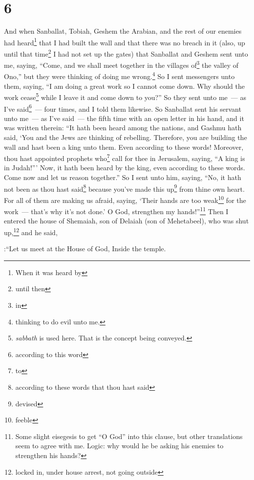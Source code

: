 \section{6}\label{Nehemiah 6}
\begin{enumerate}[align=center]
     And when Sanballat, Tobiah, Geshem the Arabian, and the rest of our enemies had heard\footnote{When it was heard by} that I had built the wall and that there was no breach in it (also, up until that time\footnote{until then} I had not set up the gates)%
     that Sanballat and Geshem sent unto me, saying, ``Come, and we shall meet together in the villages of\footnote{in} the valley of Ono,'' but they were thinking of doing me wrong.\footnote{thinking to do evil unto me.}%
     So I sent messengers unto them, saying, ``I am doing a great work so I cannot come down. Why should the work cease\footnote{\emph{sabbath} is used here. That is the concept being conveyed.} while I leave it and come down to you?''%
     So they sent unto me~--- as I've said\footnote{according to this word}~--- four times, and I told them likewise.%
     So Sanballat sent his servant unto me~--- as I've said~--- the fifth time with an open letter in his hand,%
     and it was written therein: ``It hath been heard among the nations, and Gashmu hath said, `You and the Jews are thinking of rebelling. Therefore, you are building the wall and hast been a king unto them. Even according to these words!%
     Moreover, thou hast appointed prophets who\footnote{to} call for thee in Jerusalem, saying, ``A king is in Judah!''' Now, it hath been heard by the king, even according to these words. Come now and let us reason together.''%
     So I sent unto him, saying, ``No, it hath not been as thou hast said\footnote{according to these words that thou hast said} because you've made this up\footnote{devised} from thine own heart.%
     For all of them are making us afraid, saying, `Their hands are too weak\footnote{feeble} for the work~--- that's why it's not done.' O God, strengthen my hands!''\footnote{Some slight eisegesis to get ``O God'' into this clause, but other translations seem to agree with me. Logic: why would he be asking his enemies to strengthen his hands?}%
     Then I entered the house of Shemaiah, son of Delaiah (son of Mehetabeel), who was shut up,\footnote{locked in, under house arrest, not going outside} and he said,

:``Let us meet at the House of God, Inside the temple.


\end{enumerate}
